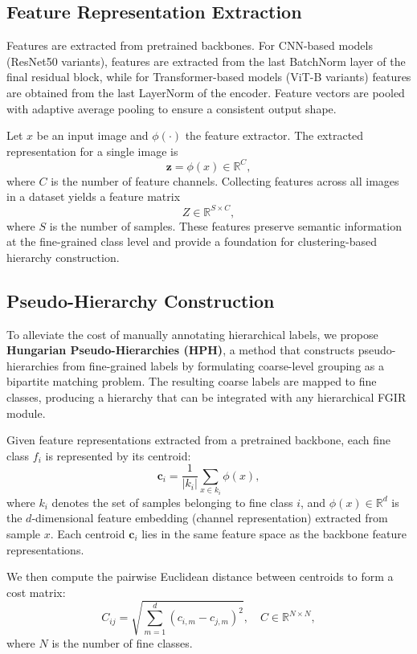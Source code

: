 \documentclass[10pt,twocolumn,letterpaper]{article}
\begin{document}
\subsection{Feature Representation Extraction}
Features are extracted from pretrained backbones. For CNN-based models (ResNet50 variants), features are extracted from the last BatchNorm layer of the final residual block, while for Transformer-based models (ViT-B variants) features are obtained from the last LayerNorm of the encoder. Feature vectors are pooled with adaptive average pooling to ensure a consistent output shape.

Let \(x\) be an input image and \(\phi(\cdot)\) the feature extractor. The extracted representation for a single image is
\[
\mathbf{z} = \phi(x) \in \mathbb{R}^{C},
\]
where \(C\) is the number of feature channels. Collecting features across all images in a dataset yields a feature matrix
\[
Z \in \mathbb{R}^{S \times C},
\]
where \(S\) is the number of samples. These features preserve semantic information at the fine-grained class level and provide a foundation for clustering-based hierarchy construction.


\subsection{Pseudo-Hierarchy Construction}
To alleviate the cost of manually annotating hierarchical labels, we propose \textbf{Hungarian Pseudo-Hierarchies (HPH)}, a method that constructs pseudo-hierarchies from fine-grained labels by formulating coarse-level grouping as a bipartite matching problem. The resulting coarse labels are mapped to fine classes, producing a hierarchy that can be integrated with any hierarchical FGIR module.

Given feature representations extracted from a pretrained backbone, each fine class \(f_i\) is represented by its centroid:
\[
\mathbf{c}_i = \frac{1}{|k_i|} \sum_{x \in k_i} \phi(x),
\]
where \(k_i\) denotes the set of samples belonging to fine class \(i\), and \(\phi(x) \in \mathbb{R}^{d}\) is the \(d\)-dimensional feature embedding (channel representation) extracted from sample \(x\). Each centroid \(\mathbf{c}_i\) lies in the same feature space as the backbone feature representations.

We then compute the pairwise Euclidean distance between centroids to form a cost matrix:
\[
C_{ij} = \sqrt{\sum_{m=1}^{d} (c_{i,m} - c_{j,m})^2}, \quad C \in \mathbb{R}^{N \times N},
\]
where \(N\) is the number of fine classes.
\end{document}

